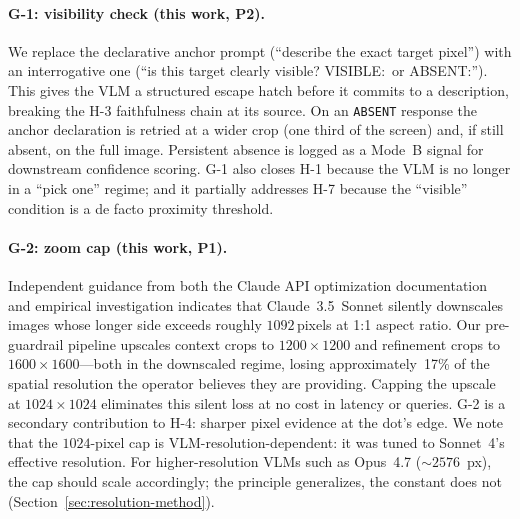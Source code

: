 \paragraph{G-1: visibility check (this work, P2).}
We replace the declarative anchor prompt (``describe the exact target
pixel'') with an interrogative one (``is this target clearly visible?
VISIBLE:\textellipsis\ or ABSENT:\textellipsis'').  This gives the VLM
a structured escape hatch before it commits to a description, breaking
the H-3 faithfulness chain at its source.  On an \texttt{ABSENT}
response the anchor declaration is retried at a wider crop (one third
of the screen) and, if still absent, on the full image.  Persistent
absence is logged as a Mode~B signal for downstream confidence
scoring.  G-1 also closes H-1 because the VLM is no longer in a
``pick one'' regime; and it partially addresses H-7 because the
``visible'' condition is a de facto proximity threshold.

\paragraph{G-2: zoom cap (this work, P1).}
Independent guidance from both the Claude API optimization documentation and
empirical investigation indicates that Claude~3.5~Sonnet silently downscales
images whose longer side exceeds roughly $1092$\,pixels at 1:1 aspect
ratio.  Our pre-guardrail pipeline upscales context crops to $1200 \times 1200$
and refinement crops to $1600 \times 1600$---both in the downscaled
regime, losing approximately~17\% of the spatial resolution the
operator believes they are providing.  Capping the upscale at $1024
\times 1024$ eliminates this silent loss at no cost in latency or
queries.  G-2 is a secondary contribution to H-4: sharper pixel
evidence at the dot's edge.  We note that the $1024$-pixel cap
is VLM-resolution-dependent: it was tuned to Sonnet~4's
effective resolution.  For higher-resolution VLMs such as
Opus~4.7 ($\sim\!2576$~px), the cap should scale accordingly;
the principle generalizes, the constant does not
(Section~\ref{sec:resolution-method}).

